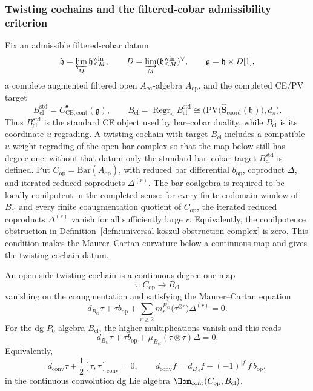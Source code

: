 \subsubsection{Twisting cochains and the filtered-cobar admissibility criterion}

\begin{defn}
\label{defn:universal-open-side-twisting-cochain}
  Fix an admissible filtered-cobar datum
  \[
    \mathfrak h=\varprojlim_M\mathfrak h^{\mathrm{win}}_{\leq M},\qquad
    D=\varinjlim_M(\mathfrak h^{\mathrm{win}}_{\leq M})^{\vee},\qquad
    \mathfrak g=\mathfrak h\ltimes D[1],
  \]
  a complete augmented filtered open \(A_\infty\)-algebra
  \(A_{\mathrm{op}}\), and the completed CE/PV target
  \[
    B^{\mathrm{std}}_{\mathrm{cl}}
      =
      C^\bullet_{\mathrm{CE},\mathrm{cont}}(\mathfrak g),
    \qquad
    B_{\mathrm{cl}}
      =
      \operatorname{Regr}_u B^{\mathrm{std}}_{\mathrm{cl}}
      \cong
      \bigl(
      \mathrm{PV}\bigl(\widehat{\mathbf S}_{\mathrm{coord}}(\mathfrak h)\bigr),
      d_\pi\bigr).
  \]
  Thus \(B^{\mathrm{std}}_{\mathrm{cl}}\) is the standard CE object used
  by bar--cobar duality, while \(B_{\mathrm{cl}}\) is its coordinate
  \(u\)-regrading.  A twisting cochain with target
  \(B_{\mathrm{cl}}\) includes a compatible \(u\)-weight regrading of
  the open bar complex so that the map below still has degree one;
  without that datum only the standard bar--cobar target
  \(B^{\mathrm{std}}_{\mathrm{cl}}\) is defined.
  Put \(C_{\mathrm{op}}=\mathrm{Bar}(A_{\mathrm{op}})\), with reduced bar
  differential \(b_{\mathrm{op}}\), coproduct \(\Delta\), and iterated
  reduced coproducts \(\Delta^{(r)}\).  The bar coalgebra is required to
  be locally conilpotent in the completed sense: for every finite codomain
  window of \(B_{\mathrm{cl}}\) and every finite coaugmentation quotient of
  \(C_{\mathrm{op}}\), the iterated reduced coproducts \(\Delta^{(r)}\)
  vanish for all sufficiently large \(r\).  Equivalently, the
  conilpotence obstruction in
  Definition~\ref{defn:universal-koszul-obstruction-complex} is zero.
  This condition makes the Maurer--Cartan curvature below a continuous
  map and gives the twisting-cochain datum.

  An open-side twisting cochain is a continuous degree-one map
  \[
    \tau\colon C_{\mathrm{op}}\longrightarrow B_{\mathrm{cl}}
  \]
  vanishing on the coaugmentation and satisfying the Maurer--Cartan
  equation
  \[
    d_{B_{\mathrm{cl}}}\tau+\tau b_{\mathrm{op}}
      +\sum_{r\geq2}
        m_r^{B_{\mathrm{cl}}}\bigl(\tau^{\otimes r}\bigr)
        \Delta^{(r)}
      =0 .
  \]
  For the dg \(P_0\)-algebra \(B_{\mathrm{cl}}\), the higher
  multiplications vanish and this reads
  \[
    d_{B_{\mathrm{cl}}}\tau+\tau b_{\mathrm{op}}
      +\mu_{B_{\mathrm{cl}}}(\tau\otimes\tau)\Delta=0 .
  \]
  Equivalently,
  \[
    d_{\mathrm{conv}}\tau+\frac12[\tau,\tau]_{\mathrm{conv}}=0,\qquad
    d_{\mathrm{conv}}f=d_{B_{\mathrm{cl}}}f
      -(-1)^{|f|}f\,b_{\mathrm{op}},
  \]
  in the continuous convolution dg Lie algebra
  \(\Hom_{\mathrm{cont}}(C_{\mathrm{op}},B_{\mathrm{cl}})\).


\end{defn}
